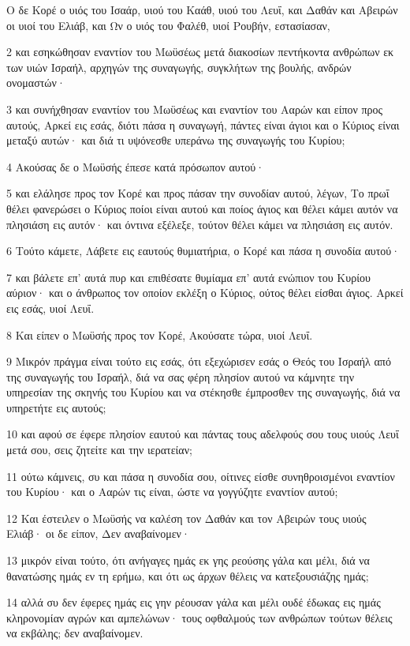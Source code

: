 \par Ο δε Κορέ ο υιός του Ισαάρ, υιού του Καάθ, υιού του Λευΐ, και Δαθάν και Αβειρών οι υιοί του Ελιάβ, και Ων ο υιός του Φαλέθ, υιοί Ρουβήν, εστασίασαν,
\par 2 και εσηκώθησαν εναντίον του Μωϋσέως μετά διακοσίων πεντήκοντα ανθρώπων εκ των υιών Ισραήλ, αρχηγών της συναγωγής, συγκλήτων της βουλής, ανδρών ονομαστών·
\par 3 και συνήχθησαν εναντίον του Μωϋσέως και εναντίον του Ααρών και είπον προς αυτούς, Αρκεί εις εσάς, διότι πάσα η συναγωγή, πάντες είναι άγιοι και ο Κύριος είναι μεταξύ αυτών· και διά τι υψόνεσθε υπεράνω της συναγωγής του Κυρίου;
\par 4 Ακούσας δε ο Μωϋσής έπεσε κατά πρόσωπον αυτού·
\par 5 και ελάλησε προς τον Κορέ και προς πάσαν την συνοδίαν αυτού, λέγων, Το πρωΐ θέλει φανερώσει ο Κύριος ποίοι είναι αυτού και ποίος άγιος και θέλει κάμει αυτόν να πλησιάση εις αυτόν· και όντινα εξέλεξε, τούτον θέλει κάμει να πλησιάση εις αυτόν.
\par 6 Τούτο κάμετε, Λάβετε εις εαυτούς θυμιατήρια, ο Κορέ και πάσα η συνοδία αυτού·
\par 7 και βάλετε επ' αυτά πυρ και επιθέσατε θυμίαμα επ' αυτά ενώπιον του Κυρίου αύριον· και ο άνθρωπος τον οποίον εκλέξη ο Κύριος, ούτος θέλει είσθαι άγιος. Αρκεί εις εσάς, υιοί Λευΐ.
\par 8 Και είπεν ο Μωϋσής προς τον Κορέ, Ακούσατε τώρα, υιοί Λευΐ.
\par 9 Μικρόν πράγμα είναι τούτο εις εσάς, ότι εξεχώρισεν εσάς ο Θεός του Ισραήλ από της συναγωγής του Ισραήλ, διά να σας φέρη πλησίον αυτού να κάμνητε την υπηρεσίαν της σκηνής του Κυρίου και να στέκησθε έμπροσθεν της συναγωγής, διά να υπηρετήτε εις αυτούς;
\par 10 και αφού σε έφερε πλησίον εαυτού και πάντας τους αδελφούς σου τους υιούς Λευΐ μετά σου, σεις ζητείτε και την ιερατείαν;
\par 11 ούτω κάμνεις, συ και πάσα η συνοδία σου, οίτινες είσθε συνηθροισμένοι εναντίον του Κυρίου· και ο Ααρών τις είναι, ώστε να γογγύζητε εναντίον αυτού;
\par 12 Και έστειλεν ο Μωϋσής να καλέση τον Δαθάν και τον Αβειρών τους υιούς Ελιάβ· οι δε είπον, Δεν αναβαίνομεν·
\par 13 μικρόν είναι τούτο, ότι ανήγαγες ημάς εκ γης ρεούσης γάλα και μέλι, διά να θανατώσης ημάς εν τη ερήμω, και ότι ως άρχων θέλεις να κατεξουσιάζης ημάς;
\par 14 αλλά συ δεν έφερες ημάς εις γην ρέουσαν γάλα και μέλι ουδέ έδωκας εις ημάς κληρονομίαν αγρών και αμπελώνων· τους οφθαλμούς των ανθρώπων τούτων θέλεις να εκβάλης; δεν αναβαίνομεν.
